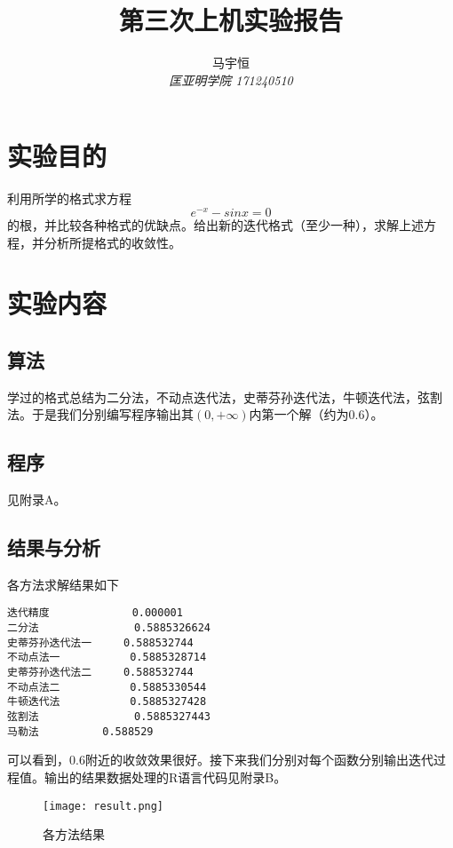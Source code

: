 \documentclass[a4paper,11pt,onecolumn,twoside]{article}
\title{\textbf{第三次上机实验报告}}
\author{
马宇恒
\\[2pt]
{\small \textit{匡亚明学院 171240510}}}
\date{}
\begin{document}
\maketitle
\thispagestyle{firststyle}
\setlength{\oddsidemargin}{ 1cm}
\setlength{\evensidemargin}{\oddsidemargin}
\setlength{\textwidth}{15.50cm}
\vspace{-.8cm}


\setcounter{page}{1}

\setlength{\oddsidemargin}{-.5cm}  %
\setlength{\evensidemargin}{\oddsidemargin}
\setlength{\textwidth}{17.00cm}

\section{实验目的}
利用所学的格式求方程$$e^{-x}-sinx=0$$的根，并比较各种格式的优缺点。给出新的迭代格式（至少一种），求解上述方程，并分析所提格式的收敛性。


\section{实验内容}
\subsection{算法}
学过的格式总结为二分法，不动点迭代法，史蒂芬孙迭代法，牛顿迭代法，弦割法。于是我们分别编写程序输出其$(0, +\infty)$内第一个解（约为0.6）。
\subsection{程序}
见附录A。
\subsection{结果与分析}
各方法求解结果如下
\begin{lstlisting}
迭代精度             0.000001
二分法               0.5885326624
史蒂芬孙迭代法一     0.588532744
不动点法一           0.5885328714
史蒂芬孙迭代法二     0.588532744
不动点法二           0.5885330544
牛顿迭代法           0.5885327428
弦割法               0.5885327443
马勒法		     0.588529
\end{lstlisting}
\par 可以看到，0.6附近的收敛效果很好。接下来我们分别对每个函数分别输出迭代过程值。输出的结果数据处理的R语言代码见附录B。
\begin{figure}[htbp]
  \centering
  \texttt{[image: result.png]}
  \caption{各方法结果} \label{result}
\end{figure}
\end{document}
